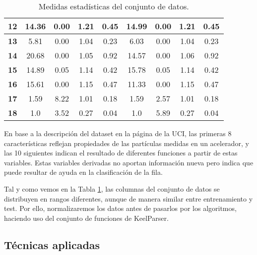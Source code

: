 \begin{table}[H]
\begin{tabular}{c|c|c|c|c||c|c|c|c|}
    \multicolumn{1}{|c|}{\textbf{12}}         & 14.36  & 0.00   & 1.21    & 0.45        & 14.99  & 0.00   & 1.21    & 0.45              \\ \hline
    \multicolumn{1}{|c|}{\textbf{13}}         & 5.81   & 0.00   & 1.04    & 0.23        & 6.03   & 0.00   & 1.04    & 0.23              \\ \hline
    \multicolumn{1}{|c|}{\textbf{14}}         & 20.68  & 0.00   & 1.05    & 0.92        & 14.57  & 0.00   & 1.06    & 0.92              \\ \hline
    \multicolumn{1}{|c|}{\textbf{15}}         & 14.89  & 0.05   & 1.14    & 0.42        & 15.78  & 0.05   & 1.14    & 0.42              \\ \hline
    \multicolumn{1}{|c|}{\textbf{16}}         & 15.61  & 0.00   & 1.15    & 0.47        & 11.33  & 0.00   & 1.15    & 0.47              \\ \hline
    \multicolumn{1}{|c|}{\textbf{17}}         & 1.59   & 8.22   & 1.01    & 0.18        & 1.59   & 2.57   & 1.01    & 0.18              \\ \hline
    \multicolumn{1}{|c|}{\textbf{18}}         & 1.0    & 3.52   & 0.27    & 0.04        & 1.0    & 5.89   & 0.27    & 0.04              \\ \hline
    \end{tabular}
    \caption{Medidas estadísticas del conjunto de datos.}
    \label{statistics}
\end{table}

En base a la descripción del dataset en la página de la UCI, las primeras 8 características reflejan propiedades de las partículas medidas en un acelerador, y las 10 siguientes indican el resultado de diferentes funciones a partir de estas variables. Estas variables derivadas no aportan información nueva pero indica que puede resultar de ayuda en la clasificación de la fila.

\vspace{\baselineskip}

Tal y como vemos en la Tabla \ref{statistics}, las columnas del conjunto de datos se distribuyen en rangos diferentes, aunque de manera similar entre entrenamiento y test. Por ello, normalizaremos los datos antes de pasarlos por los algoritmos, haciendo uso del conjunto de funciones de KeelParser.

\newpage

\subsection{Técnicas aplicadas}

